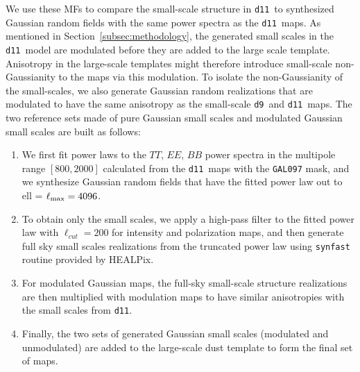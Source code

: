 \documentclass[twocolumn]{aastex631}
\newcommand{\dnine}{{\tt d9}}
\newcommand{\deleven}{{\tt d11}}
\begin{document}
We use these MFs to compare the small-scale structure in \deleven\ to synthesized Gaussian random fields with the same power spectra as the \deleven\ maps.
As mentioned in Section~\ref{subsec:methodology}, the generated small scales in the \deleven\ model are modulated before they are added to the large scale template. Anisotropy in the large-scale templates might therefore introduce small-scale non-Gaussianity to the maps via this modulation. %
To isolate the non-Gaussianity of the small-scales, we also generate Gaussian random realizations that are modulated to have the same anisotropy as the small-scale \dnine\ and \deleven\ maps. The two reference sets made of pure Gaussian small scales and modulated Gaussian small scales are built as follows:

\begin{enumerate}

\item We first fit power laws to the $TT$, $EE$, $BB$ power spectra in the multipole range $[800, 2000]$ calculated from the \deleven\ maps with the \texttt{GAL097} mask, and we synthesize Gaussian random fields that have the fitted power law out to ell = $\ell_{\rm max}=4096$. 

\item To obtain only the small scales, we apply a high-pass filter to the fitted power law with $\ell_{cut} = 200$ for intensity and polarization maps, and then generate full sky small scales realizations from the truncated power law using \texttt{synfast} routine provided by HEALPix. 

\item For modulated Gaussian maps, the full-sky small-scale structure realizations are then multiplied with modulation maps to have similar anisotropies with the small scales from \deleven{}. %


\item Finally, the two sets of generated Gaussian small scales (modulated and unmodulated) are added to the large-scale dust template to form the final set of maps.
\end{enumerate}
\end{document}
